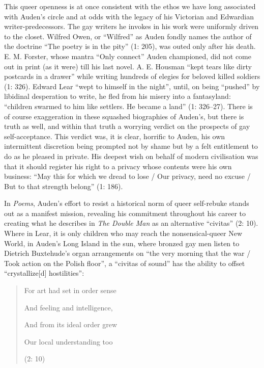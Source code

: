 \documentclass{article}
\begin{document}
This queer openness is at once consistent with the ethos we have long
associated with Auden's circle and at odds with the legacy of his
Victorian and Edwardian writer-predecessors. The gay
writers he invokes in his work were uniformly driven to the closet.
Wilfred Owen, or ``Wilfred'' as Auden fondly names the author of the
doctrine ``The poetry is in the pity'' (1: 205), was outed only after
his death. E. M. Forster, whose mantra ``Only connect'' \parencite[195]{forster_howards_1991} Auden championed, did not come out in print (as it were) till his
last novel. A. E. Housman ``kept tears like dirty postcards in a
drawer'' while writing hundreds of elegies for beloved killed
soldiers (1: 326). Edward Lear ``wept to himself in the night'', until,
on being ``pushed'' by libidinal desperation to write, he fled from his
misery into a fantasyland: ``children swarmed to him like settlers. He
became a land'' (1: 326--27). There is of course exaggeration in these
squashed biographies of Auden's, but there is truth as well, and within
that truth a worrying verdict on the prospects of gay self-acceptance.
This verdict was, it is clear, horrific to Auden, his own intermittent
discretion being prompted not by shame but by a felt entitlement to do
as he pleased in private. His deepest wish on behalf of modern
civilisation was that it should register his right to a privacy whose
contents were his own business: ``May this for which we dread to lose /
Our privacy, need no excuse / But to that strength belong'' (1: 186).

In \emph{Poems}, Auden's effort to resist a historical norm of queer
self-rebuke stands out as a manifest mission, revealing his commitment
throughout his career to creating what he describes in \emph{The Double
Man} as an alternative ``civitas'' (2: 10). Where in Lear, it is only
children who may reach the nonsensical-queer New World, in Auden's Long
Island in the sun, where bronzed gay men listen to Dietrich Buxtehude's
organ arrangements on ``the very morning that the war / Took action on
the Polish floor'', a ``civitas of sound'' has the ability to offset
``crystallize{[}d{]} hostilities'':

\begin{quote}
For art had set in order sense

And feeling and intelligence,

And from its ideal order grew

Our local understanding too

\begin{flushright}
(2: 10)
\end{flushright}
\end{quote}
\end{document}
